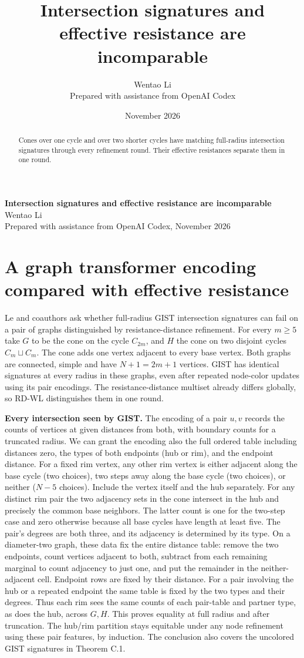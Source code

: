 \documentclass[11pt]{article}
\title{Intersection signatures and effective resistance are incomparable}
\author{Wentao Li\\{\small Prepared with assistance from OpenAI Codex}}
\date{November 2026}
\begin{document}
\begin{center}{\Large\bfseries Intersection signatures and effective resistance are incomparable}\\[3pt]Wentao Li\\{\small Prepared with assistance from OpenAI Codex, November 2026}\end{center}
\begin{abstract}
Cones over one cycle and over two shorter cycles have matching full-radius intersection signatures through every refinement round. Their effective resistances separate them in one round.
\end{abstract}
\section*{A graph transformer encoding compared with effective resistance}
Le and coauthors ask whether full-radius GIST intersection signatures can fail on a pair of graphs distinguished by resistance-distance refinement. For every $m\ge5$ take $G$ to be the cone on the cycle $C_{2m}$, and $H$ the cone on two disjoint cycles $C_m\sqcup C_m$. The cone adds one vertex adjacent to every base vertex. Both graphs are connected, simple and have $N+1=2m+1$ vertices. GIST has identical signatures at every radius in these graphs, even after repeated node-color updates using its pair encodings. The resistance-distance multiset already differs globally, so RD-WL distinguishes them in one round.

\textbf{Every intersection seen by GIST.} The encoding of a pair $u,v$ records the counts of vertices at given distances from both, with boundary counts for a truncated radius. We can grant the encoding also the full ordered table including distances zero, the types of both endpoints (hub or rim), and the endpoint distance. For a fixed rim vertex, any other rim vertex is either adjacent along the base cycle (two choices), two steps away along the base cycle (two choices), or neither ($N-5$ choices). Include the vertex itself and the hub separately. For any distinct rim pair the two adjacency sets in the cone intersect in the hub and precisely the common base neighbors. The latter count is one for the two-step case and zero otherwise because all base cycles have length at least five. The pair's degrees are both three, and its adjacency is determined by its type. On a diameter-two graph, these data fix the entire distance table: remove the two endpoints, count vertices adjacent to both, subtract from each remaining marginal to count adjacency to just one, and put the remainder in the neither-adjacent cell. Endpoint rows are fixed by their distance. For a pair involving the hub or a repeated endpoint the same table is fixed by the two types and their degrees. Thus each rim sees the same counts of each pair-table and partner type, as does the hub, across $G,H$. This proves equality at full radius and after truncation. The hub/rim partition stays equitable under any node refinement using these pair features, by induction. The conclusion also covers the uncolored GIST signatures in Theorem C.1.
\end{document}
